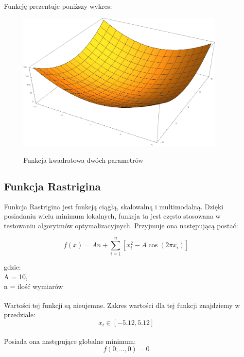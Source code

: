 \documentclass[twoside]{projektInzynierskiMS1}
\newcommand{\newLine}{~\\}
\newcommand{\si}{ś}
\begin{document}
Funkcję prezentuje poniższy wykres:\\
\begin{figure}[H]
	\begin{center}
		\includegraphics[height=7cm]{quadraticFunction1.png}\\
	\end{center}
	\caption{Funkcja kwadratowa dwóch parametrów}
\end{figure}

	\subsection{Funkcja Rastrigina}
	Funkcja Rastrigina jest funkcją ciągłą, skalowalną i multimodalną. Dzięki posiadaniu wielu minimum lokalnych, funkcja ta jest często stosowana w testowaniu algorytmów optymalizacyjnych. Przyjmuje ona następującą postać:

\[f(x) = An + \sum_{i=1}^{n} [x_i^2 - A \cos{\left(2 \pi x_i\right)}] \]

gdzie: \\
A = 10, \\
n = ilo\si ć wymiarów \\ \newLine

Warto\si ci tej funkcji są nieujemne. Zakres warto\si ci dla tej funkcji znajdziemy w przedziale:
\[x_i \in [-5.12, 5.12] \] \\

Posiada ona następujące globalne minimum:
\[ f(0,...,0) = 0 \] \\
\end{document}

